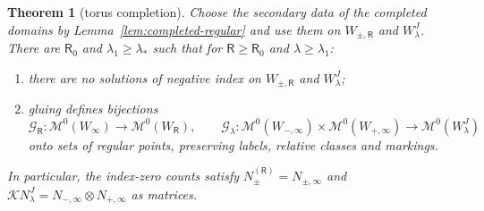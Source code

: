\documentclass[11pt]{amsart}
\newtheorem{theorem}{Theorem}[section]
\theoremstyle{definition}
\theoremstyle{remark}
\theoremstyle{plain}
\numberwithin{equation}{section}
\newcommand{\cM}{\mathcal{M}}
\begin{document}
\begin{theorem}[torus completion]\label{thm:torus-completion}
Choose the secondary data of the completed domains by
Lemma~\ref{lem:completed-regular} and use them on $W_{\pm,\mathsf R}$ and $W^J_\lambda$. There are
$\mathsf R_0$ and $\lambda_1\ge\lambda_*$ such that for $\mathsf R\ge \mathsf R_0$ and $\lambda\ge\lambda_1$:
\begin{enumerate}[label=(\roman*)]
\item there are no solutions of negative index on $W_{\pm,\mathsf R}$ and $W^J_\lambda$;
\item gluing defines bijections
  \[
  \mathcal G_\mathsf R\colon\cM^0(W_\infty)\to\cM^0(W_\mathsf R),\qquad
  \mathcal G_\lambda\colon\cM^0(W_{-,\infty})\times\cM^0(W_{+,\infty})\to\cM^0(W^J_\lambda)
  \]
  onto sets of regular points, preserving labels, relative classes and markings.
\end{enumerate}
In particular, the index-zero counts satisfy $N_\pm^{(\mathsf R)}=N_{\pm,\infty}$ and
$\mathcal KN^J_\lambda=N_{-,\infty}\otimes N_{+,\infty}$ as matrices.
\end{theorem}
\end{document}
